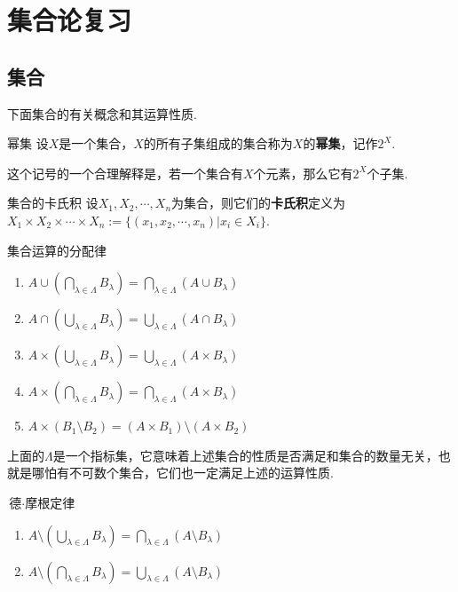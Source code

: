 \chapter{集合论复习}

\section{集合}

下面集合的有关概念和其运算性质.

\begin{definition}{幂集}
    设$X$是一个集合，$X$的所有子集组成的集合称为$X$的\textbf{幂集}，记作$2^X$.
\end{definition}

这个记号的一个合理解释是，若一个集合有$X$个元素，那么它有$2^X$个子集.

\begin{definition}{集合的卡氏积}
    设$X_1,X_2,\cdots,X_n$为集合，则它们的\textbf{卡氏积}定义为$X_1\times X_2\times\cdots\times X_n := \big\{(x_1,x_2,\cdots,x_n)|x_i\in X_i\big\}$.
\end{definition}

\begin{proposition}{集合运算的分配律}
    \wideline
    \begin{enumerate}
        \item $A\cup \left(\bigcap_{\lambda\in\Lambda}B_\lambda\right)=\bigcap_{\lambda\in\Lambda}{\left(A\cup B_\lambda\right)}$
        \item $A\cap \left(\bigcup_{\lambda\in\Lambda}B_\lambda\right)=\bigcup_{\lambda\in\Lambda}{\left(A\cap B_\lambda\right)}$
        \item $A\times \left(\bigcup_{\lambda\in\Lambda}B_\lambda\right)=\bigcup_{\lambda\in\Lambda}{\left(A\times B_\lambda\right)}$
        \item $A\times \left(\bigcap_{\lambda\in\Lambda}B_\lambda\right)=\bigcap_{\lambda\in\Lambda}{\left(A\times B_\lambda\right)}$
        \item $A\times \left(B_1\setminus B_2\right)=(A\times B_1)\setminus (A\times B_2)$
    \end{enumerate}
\end{proposition}
上面的$\Lambda$是一个指标集，它意味着上述集合的性质是否满足和集合的数量无关，也就是哪怕有不可数个集合，它们也一定满足上述的运算性质.

\begin{theorem}{$\text{德}\cdot\text{摩根定律}$}
    \wideline
    \begin{enumerate}
        \item $A\setminus \left(\bigcup_{\lambda\in\Lambda}{B_{\lambda}}\right)=\bigcap_{\lambda\in\Lambda}{\left(A\setminus B_{\lambda}\right)}$
        \item $A\setminus \left(\bigcap_{\lambda\in\Lambda}{B_{\lambda}}\right)=\bigcup_{\lambda\in\Lambda}{\left(A\setminus B_{\lambda}\right)}$
    \end{enumerate}
\end{theorem}

